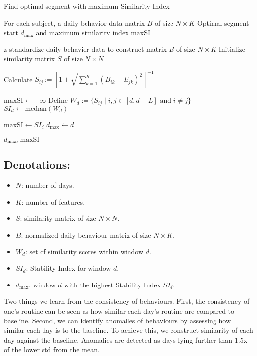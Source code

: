 \documentclass[pdflatex,sn-vancouver,Numbered]{bst/sn-jnl}%
\theoremstyle{thmstyleone}%
\theoremstyle{thmstyletwo}%
\theoremstyle{thmstylethree}%
\begin{document}
\begin{algorithm}
\caption{Find optimal segment with maximum Similarity Index}\label{alg:max_similarity}
\begin{algorithmic}
\Require For each subject, a daily behavior data matrix $B$ of size $N \times K$
\Ensure Optimal segment start $d_{\text{max}}$ and maximum similarity index $\text{maxSI}$

\State z-standardize daily behavior data to construct matrix $B$ of size $N \times K$
\State Initialize similarity matrix $S$ of size $N \times N$

            \State Calculate $S_{ij} := \left[ 1 + \sqrt{\sum_{k=1}^K (B_{ik} - B_{jk})^2} \right]^{-1}$
        \EndIf
    \EndFor
\EndFor

\State $\text{maxSI} \gets -\infty$
    \State Define $W_d := \{ S_{ij} \mid i, j \in [d, d+L] \text{ and } i \neq j \}$
    \State $SI_d \gets \text{median}(W_d)$

        \State $\text{maxSI} \gets SI_d$
        \State $d_{\text{max}} \gets d$
    \EndIf
\EndFor

\State \Return $d_{\text{max}}, \text{maxSI}$
\end{algorithmic}
\end{algorithm}

\subsection*{Denotations:}
\begin{itemize}
    \item \( N \): number of days.
    \item \( K \): number of features.
    \item \( S \): similarity matrix of size \( N \times N \).
    \item \( B \): normalized daily behaviour matrix of size \( N \times K \).
    \item \( W_d \): set of similarity scores within window \( d \).
    \item \( SI_d \): Stability Index for window \( d \).
    \item \( d_{\text{max}} \): window \( d \) with the highest Stability Index \( SI_d \).
\end{itemize}

Two things we learn from the consistency of behaviours. First, the consistency of one's routine can be seen as how similar each day's routine are compared to baseline. Second, we can identify anomalies of behaviours by assessing how similar each day is to the baseline. To achieve this, we construct similarity of each day against the baseline. Anomalies are detected as days lying further than 1.5x of the lower std from the mean.
\end{document}
